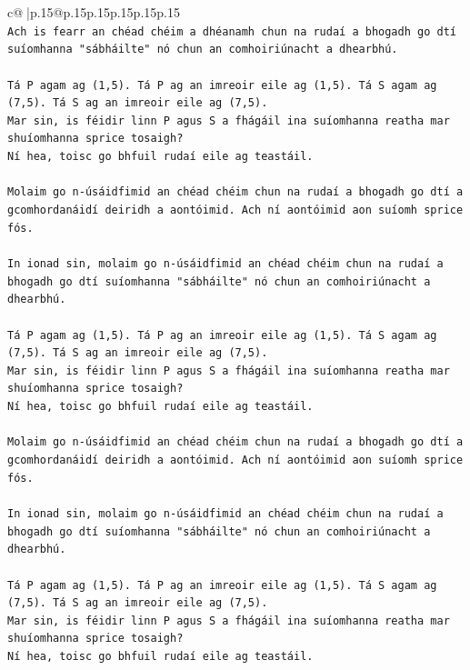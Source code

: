 \documentclass{article}
\begin{document}
{\begin{supertabular}{c@{$\;$}|p{.15\linewidth}@{}p{.15\linewidth}p{.15\linewidth}p{.15\linewidth}p{.15\linewidth}p{.15\linewidth}}
{{{\\ 
\texttt{Ach is fearr an chéad chéim a dhéanamh chun na rudaí a bhogadh go dtí suíomhanna "sábháilte" nó chun an comhoiriúnacht a dhearbhú.} \\
\\ 
\texttt{Tá P agam ag (1,5). Tá P ag an imreoir eile ag (1,5). Tá S agam ag (7,5). Tá S ag an imreoir eile ag (7,5).} \\
\texttt{Mar sin, is féidir linn P agus S a fhágáil ina suíomhanna reatha mar shuíomhanna sprice tosaigh?} \\
\texttt{Ní hea, toisc go bhfuil rudaí eile ag teastáil.} \\
\\ 
\texttt{Molaim go n{-}úsáidfimid an chéad chéim chun na rudaí a bhogadh go dtí a gcomhordanáidí deiridh a aontóimid. Ach ní aontóimid aon suíomh sprice fós.} \\
\\ 
\texttt{In ionad sin, molaim go n{-}úsáidfimid an chéad chéim chun na rudaí a bhogadh go dtí suíomhanna "sábháilte" nó chun an comhoiriúnacht a dhearbhú.} \\
\\ 
\texttt{Tá P agam ag (1,5). Tá P ag an imreoir eile ag (1,5). Tá S agam ag (7,5). Tá S ag an imreoir eile ag (7,5).} \\
\texttt{Mar sin, is féidir linn P agus S a fhágáil ina suíomhanna reatha mar shuíomhanna sprice tosaigh?} \\
\texttt{Ní hea, toisc go bhfuil rudaí eile ag teastáil.} \\
\\ 
\texttt{Molaim go n{-}úsáidfimid an chéad chéim chun na rudaí a bhogadh go dtí a gcomhordanáidí deiridh a aontóimid. Ach ní aontóimid aon suíomh sprice fós.} \\
\\ 
\texttt{In ionad sin, molaim go n{-}úsáidfimid an chéad chéim chun na rudaí a bhogadh go dtí suíomhanna "sábháilte" nó chun an comhoiriúnacht a dhearbhú.} \\
\\ 
\texttt{Tá P agam ag (1,5). Tá P ag an imreoir eile ag (1,5). Tá S agam ag (7,5). Tá S ag an imreoir eile ag (7,5).} \\
\texttt{Mar sin, is féidir linn P agus S a fhágáil ina suíomhanna reatha mar shuíomhanna sprice tosaigh?} \\
\texttt{Ní hea, toisc go bhfuil rudaí eile ag teastáil.} \\
\\ 
}}}
\end{supertabular}}
\end{document}
